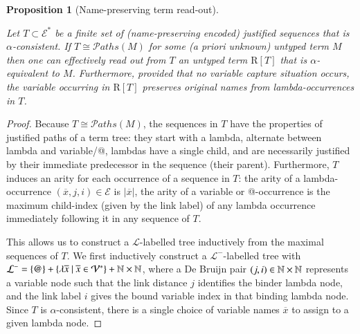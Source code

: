 \documentclass{elsarticle}
\theoremstyle{plain}
\newtheorem{proposition}[theorem]{Proposition}
\theoremstyle{definition}
\def\structisomorphic{\cong} %
\def\readout{\mathrm{R}} %
\def\nameencoding{\mathcal{E}} %
\newcommand\pathset{{\mathcal{P}aths}} %
\begin{document}
\begin{proposition}[Name-preserving term read-out]
\label{proposition:termtree_readout_from_justitied_paths}

Let $T\subset \nameencoding^*$ be a finite set of (name-preserving encoded) justified sequences  that is $\alpha$-consistent.
If $T\structisomorphic \pathset(M)$ for some (a priori unknown) untyped term $M$ then one can effectively read out from $T$ an untyped
term  $\readout[T]$ that is $\alpha$-equivalent to $M$.
%
Furthermore, provided that no variable capture situation occurs, the variable  occurring in $\readout[T]$ preserves original names from lambda-occurrences in $T$.
\end{proposition}
\begin{proof}
    Because $T \structisomorphic \pathset(M)$, the sequences in $T$ have the properties
of justified paths of a term tree: they start with a lambda, alternate between lambda and variable/@, lambdas have
a single child, and are necessarily justified by their immediate predecessor in the sequence (their parent).
Furthermore, $T$ induces an arity for each occurrence of a sequence in $T$: the arity of a lambda-occurrence $(\overline{x},j,i)\in\nameencoding$ is $|\overline{x}|$, the arity of a variable or @-occurrence is the maximum
child-index (given by the link label) of any lambda occurrence immediately following it in any sequence of $T$.

This allows us to construct a $\mathcal{L}$-labelled tree
inductively from the maximal sequences of $T$.
We first inductively construct a $\mathcal{L^-}$-labelled tree with
$\mathcal{L^-} = \{ @ \} + \{
    \lambda \overline{x} \ | \
    \overline{x} \in \mathcal{V}^* \} + \mathbb{N}\times\mathbb{N}$,
where a De Bruijn pair $(j,i)\in \mathbb{N}\times\mathbb{N}$ represents a variable node such that the link distance $j$ identifies the binder lambda node, and the link label $i$ gives the bound variable index in that binding lambda node. Since $T$ is $\alpha$-consistent, there is a single choice of variable names $\overline{x}$ to assign to a given lambda node.


\end{proof}
\end{document}
